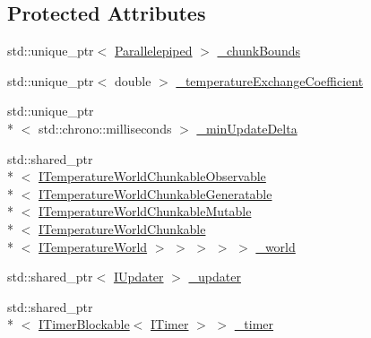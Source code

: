 \subsection*{Protected Attributes}
\begin{DoxyCompactItemize}
\item 
std\-::unique\-\_\-ptr$<$ \hyperlink{struct_parallelepiped}{Parallelepiped} $>$ \hyperlink{class_scaling_generatable_chunked_temperature_world_injector_a511f1fe9ca03a0a986a2c5fef635ffac}{\-\_\-chunk\-Bounds}
\item 
std\-::unique\-\_\-ptr$<$ double $>$ \hyperlink{class_scaling_generatable_chunked_temperature_world_injector_a53d05cc0f6fc96e9c8e78fcfc2255f63}{\-\_\-temperature\-Exchange\-Coefficient}
\item 
std\-::unique\-\_\-ptr\\*
$<$ std\-::chrono\-::milliseconds $>$ \hyperlink{class_scaling_generatable_chunked_temperature_world_injector_aed21ecf6e5237f4a0fd9cea9112c2f03}{\-\_\-min\-Update\-Delta}
\item 
std\-::shared\-\_\-ptr\\*
$<$ \hyperlink{class_i_temperature_world_chunkable_observable}{I\-Temperature\-World\-Chunkable\-Observable}\\*
$<$ \hyperlink{class_i_temperature_world_chunkable_generatable}{I\-Temperature\-World\-Chunkable\-Generatable}\\*
$<$ \hyperlink{class_i_temperature_world_chunkable_mutable}{I\-Temperature\-World\-Chunkable\-Mutable}\\*
$<$ \hyperlink{class_i_temperature_world_chunkable}{I\-Temperature\-World\-Chunkable}\\*
$<$ \hyperlink{class_i_temperature_world}{I\-Temperature\-World} $>$ $>$ $>$ $>$ $>$ \hyperlink{class_scaling_generatable_chunked_temperature_world_injector_a8af169452d94765c5bdd6302f5420ebb}{\-\_\-world}
\item 
std\-::shared\-\_\-ptr$<$ \hyperlink{class_i_updater}{I\-Updater} $>$ \hyperlink{class_scaling_generatable_chunked_temperature_world_injector_aa94745f5caba594ed9dcfbfc21685358}{\-\_\-updater}
\item 
std\-::shared\-\_\-ptr\\*
$<$ \hyperlink{class_i_timer_blockable}{I\-Timer\-Blockable}$<$ \hyperlink{class_i_timer}{I\-Timer} $>$ $>$ \hyperlink{class_scaling_generatable_chunked_temperature_world_injector_a4b12d32e1931d08dd426bd28165d8194}{\-\_\-timer}
\end{DoxyCompactItemize}


